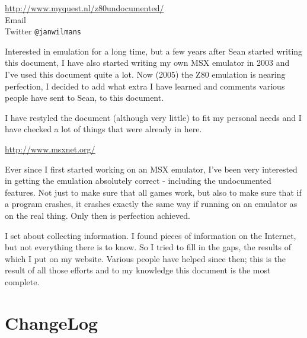 \begin{description}[style=unboxed,leftmargin=0cm]
	\item[Jan]\hfill
	
	\url{http://www.myquest.nl/z80undocumented/}\\
	Email \\
	Twitter {\tt @janwilmans}

	Interested in emulation for a long time, but a few years after Sean started writing this document, I have also started writing my own MSX emulator in 2003 and I've used this document quite a lot. Now (2005) the Z80 emulation is nearing perfection, I decided to add what extra I have learned and comments various people have sent to Sean, to this document.

	I have restyled the document (although very little) to fit my personal needs and I have checked a lot of things that were already in here.
 
	\item[Sean]\hfill

	\url{http://www.msxnet.org/}
	
	Ever since I first started working on an MSX emulator, I've been very interested in getting the emulation absolutely correct - including the undocumented features. Not just to make sure that all games work, but also to make sure that if a program crashes, it crashes exactly the same way if running on an emulator as on the real thing. Only then is perfection achieved.

	I set about collecting information. I found pieces of information on the Internet, but not everything there is to know. So I tried to fill in the gaps, the results of which I put on my website. Various people have helped since then; this is the result of all those efforts and to my knowledge this document is the most complete.
\end{description}


\pagebreak
\section{ChangeLog}

